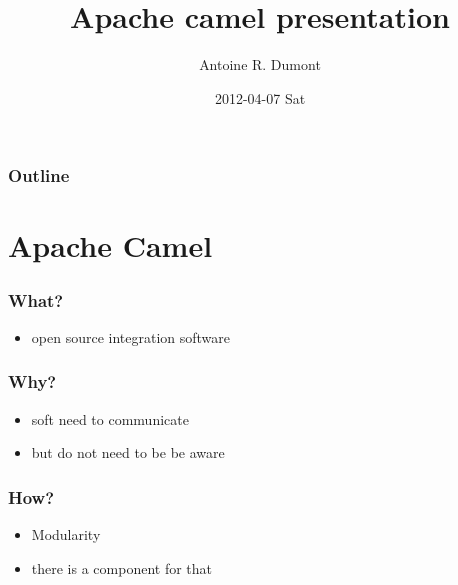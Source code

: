 \documentclass[bigger]{beamer}
\title{Apache camel presentation}
\author{Antoine R. Dumont}
\date{2012-04-07 Sat}
\begin{document}
\maketitle

\begin{frame}
\frametitle{Outline}
\setcounter{tocdepth}{3}
\tableofcontents
\end{frame}



\section{Apache Camel}
\label{sec-1}
\begin{frame}
\frametitle{What?}
\label{sec-1-1}

\begin{itemize}
\item open source integration software
\end{itemize}
\end{frame}
\begin{frame}
\frametitle{Why?}
\label{sec-1-2}

\begin{itemize}
\item soft need to communicate
\item but do not need to be be aware
\end{itemize}
\end{frame}
\begin{frame}
\frametitle{How?}
\label{sec-1-3}
\begin{itemize}

\item Modularity
\label{sec-1-3-1}%

\item there is a component for that
\label{sec-1-3-2}%
\end{itemize} %
\end{frame}
\end{document}
